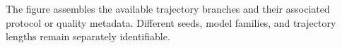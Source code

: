 The figure assembles the available trajectory branches and their associated protocol or quality metadata. Different seeds, model families, and trajectory lengths remain separately identifiable.
